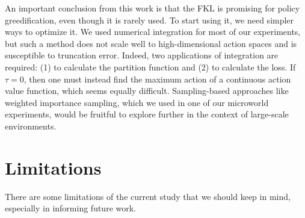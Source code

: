 \documentclass[\main/thesis.tex]{subfiles}
\begin{document}
An important conclusion from this work is that the FKL is promising for policy greedification, even though it is rarely used. To start using it, we need simpler ways to optimize it. We used numerical integration for most of our experiments, but such a method does not scale well to high-dimensional action spaces and is susceptible to truncation error. Indeed, two applications of integration are required: (1) to calculate the partition function and (2) to calculate the loss. If $\tau = 0$, then one must instead find the maximum action of a continuous action value function, which seems equally difficult. Sampling-based approaches like weighted importance sampling, which we used in one of our microworld experiments, would be fruitful to explore further in the context of large-scale environments. 

\section{Limitations}
There are some limitations of the current study that we should keep in mind, especially in informing future work.
\end{document}
